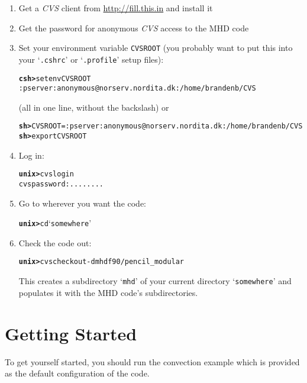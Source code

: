 \documentclass[12pt,twoside,notitlepage,a4paper]{article}
\newcommand{\prompt}[1]{{\ttfamily\bfseries{}#1}}
\newcommand{\code}[1]{\texttt{#1}}
\newcommand{\env}[1]{\code{#1}\index{#1}}
\newcommand{\file}[1]{`\texttt{#1}'}
\newcommand{\name}[1]{\textsl{#1}\index{#1}\/}
\newcommand{\bcks}{{\symbol{92}}}
\newcommand{\bs}{\bcks}       %
\begin{document}
\begin{enumerate}

\item Get a \name{CVS} client from \url{http://fill.this.in} and install it

\item Get the password for anonymous \name{CVS} access to the MHD code

\item Set your environment variable \env{CVSROOT} (you probably want to
  put this into your \file{.cshrc} or \file{.profile} setup files):
  \begin{alltt}
  \prompt{csh> } setenv CVSROOT \bs
        :pserver:anonymous@norserv.nordita.dk:/home/brandenb/CVS \
  \end{alltt}
  (all in one line, without the backslash) or
  \begin{alltt}
  \prompt{sh> } CVSROOT=:pserver:anonymous@norserv.nordita.dk:/home/brandenb/CVS
  \prompt{sh> } export CVSROOT \
  \end{alltt}

\item Log in:
  \begin{alltt}
  \prompt{unix> } cvs login
  cvs password: ........ \
\end{alltt}

\item Go to wherever you want the code:
  \begin{alltt}
  \prompt{unix> } cd \file{somewhere} \
  \end{alltt}

\item Check the code out:
  \begin{alltt}
  \prompt{unix> } cvs checkout -d mhd f90/pencil_modular \
  \end{alltt} 
  This creates a subdirectory \file{mhd} of your current directory
  \file{somewhere} and populates it with the MHD code's subdirectories.

\end{enumerate}



\section{Getting Started}

To get yourself started, you should run the convection example which is
provided as the default configuration of the code.
\end{document}

